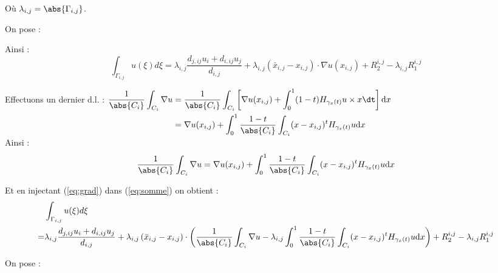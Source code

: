 \documentclass[12pt,a4paper]{article}
\begin{document}
	Où $\lambda_{i,j} = \abs{\Gamma_{i,j}}$.
	
	\vspace{.2cm}
	
	On pose :
	
	
	Ainsi : \begin{equation}\label{eq:somme}
		\displaystyle\int_{\Gamma_{i,j}} u( \xi)d \xi = \lambda_{i,j}\dfrac{d_{j,ij}u_i + d_{i,ij}u_j}{d_{i,j}} + \lambda_{i,j}\left( {\bar x_{i,j}-  x_{i,j}}\right)\cdot {\nabla u}(  x_{i,j}) + R_2^{i,j} - \lambda_{i,j}R_1^{i,j}
	\end{equation}
	
	Effectuons un dernier d.l. : $\begin{aligned}[t]
		\dfrac1{\abs{C_i}}\displaystyle\int_{C_i}  {\nabla u} &= \dfrac1{\abs{C_i}}\int_{C_i} \left[ {\nabla u}(  x_{i,j}) + \int_0^1 (1-t)H_{\gamma_x(t)}u \times x \dt\right]\mathrm d  x\\
		&= {\nabla u}(  x_{i,j}) + \int_0^1 \dfrac{1-t}{\abs{C_i}}\int_{C_i} ( {x-x_{i,j}})^tH_{\gamma_x(t)}u\mathrm d  x
	\end{aligned}$\\
	
	Ainsi : 
	\begin{equation}\label{eq:grad}
		\dfrac1{\abs{C_i}}\displaystyle\int_{C_i}  {\nabla u} = {\nabla u}(  x_{i,j}) + \int_0^1 \dfrac{1-t}{\abs{C_i}}\int_{C_i} ( {x-x_{i,j}})^tH_{\gamma_x(t)}u\mathrm d  x
	\end{equation}
	
	Et en injectant (\ref{eq:grad}) dans (\ref{eq:somme}) on obtient :
	\[
	\begin{aligned}
		&\displaystyle\int_{\Gamma_{i,j}} u( \xi)d \xi \\
		=& \lambda_{i,j}\dfrac{d_{j,ij}u_i + d_{i,ij}u_j}{d_{i,j}} + \lambda_{i,j}\left( {\bar x_{i,j}-x_{i,j}}\right)\cdot\left(\dfrac1{\abs{C_i}}\displaystyle\int_{C_i}  {\nabla u}- \lambda_{i,j}\int_0^1 \dfrac{1-t}{\abs{C_i}}\int_{C_i} ( {x-x_{i,j}})^tH_{\gamma_x(t)}u\mathrm d  x\right) + R_2^{i,j} - \lambda_{i,j}R_1^{i,j}
	\end{aligned}
	\]
	
	On pose :
	
	
\end{document}
